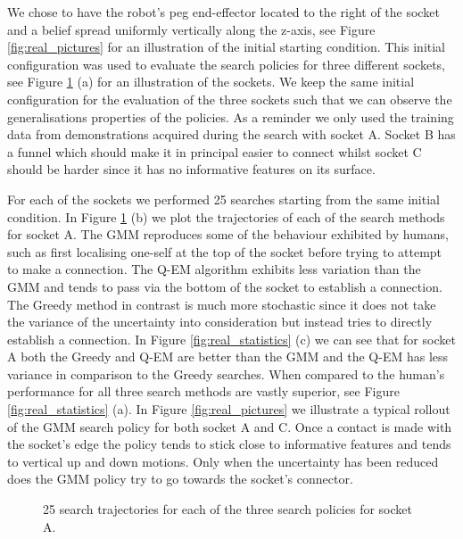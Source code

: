 We chose to have the robot's peg end-effector located to the right of the socket and a belief spread uniformly 
vertically along the z-axis, see Figure \ref{fig:real_pictures} for an illustration of the initial starting condition.
This initial configuration was used to evaluate the search policies for three different sockets, see Figure \ref{fig:real_policy} (a) for 
an illustration of the sockets. We keep the same initial configuration for the evaluation of the three sockets such that 
we can observe the generalisations properties of the policies. As a reminder we only used the training data 
from demonstrations acquired during the search with socket A. Socket B has a funnel which should make it in principal 
easier to connect whilst socket C should be harder since it has no informative features on its surface. 

For each of the sockets we performed 25 searches starting from the same initial condition. In Figure \ref{fig:real_policy} (b) we plot
the trajectories of each of the search methods for socket A. The GMM reproduces some of the behaviour exhibited by humans, such as 
first localising one-self at the top of the socket before trying to attempt to make a connection. The Q-EM algorithm exhibits less variation
than the GMM and tends to pass via the bottom of the socket to establish a connection. The Greedy method in contrast is much more  
stochastic since it does not take the variance of the uncertainty into consideration but instead tries to directly establish a connection.
In Figure \ref{fig:real_statistics} (c) we can see that for socket A both the Greedy and Q-EM are better than the GMM and the Q-EM has less
variance in comparison to the Greedy searches. When compared to the human's performance for all three search methods are vastly superior, 
see Figure \ref{fig:real_statistics} (a).  In Figure \ref{fig:real_pictures} we illustrate a typical rollout of the GMM search policy for both 
socket A and C. Once a contact is made with the socket's edge the policy tends to stick close to informative features and tends to vertical 
up and down motions. Only when the uncertainty has been reduced does the GMM policy try to go towards the socket's connector. 

\begin{figure}
 \centering
    \caption{%
    25 search trajectories for each of the three search policies for socket A. }
    \label{fig:real_policy}
\end{figure}


